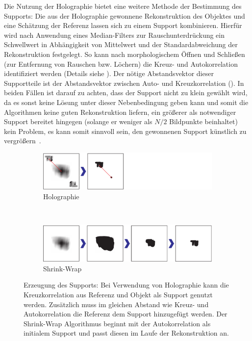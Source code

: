 Die Nutzung der Holographie bietet eine weitere Methode der Bestimmung des Supports: Die aus der Holographie gewonnene Rekonstruktion des Objektes und eine Schätzung der Referenz lassen sich zu einem Support kombinieren. Hierfür wird nach Anwendung eines Median-Filters zur Rauschunterdrückung ein Schwellwert in Abhängigkeit von Mittelwert und der Standardabweichung der Rekonstruktion festgelegt. So kann nach morphologischem Öffnen und Schließen (zur Entfernung von Rauschen bzw. Löchern) die Kreuz- und Autokorrelation identifiziert werden (Details siehe ). Der nötige Abstandsvektor dieser Supportteile ist der Abstandsvektor zwischen Auto- und Kreuzkorrelation ().
In beiden Fällen ist darauf zu achten, dass der Support nicht zu klein gewählt wird, da es sonst keine Lösung unter dieser Nebenbedingung geben kann und somit die Algorithmen keine guten Rekonstruktion liefern, ein größerer als notwendiger Support bereitet hingegen (solange er weniger als $N/2$ Bildpunkte beinhaltet) kein Problem, es kann somit sinnvoll sein, den gewonnenen Support künstlich zu vergrößern~\cite{huang2010}.

\begin{figure}
	\centering
	\begin{subfigure}[b]{0.9\textwidth}
		\includegraphics[width=\textwidth]{images/support_holo.pdf}
		\caption{Holographie}
	\end{subfigure}\\

	\begin{subfigure}[b]{0.9\textwidth}
		\includegraphics[width=\textwidth]{images/support_sw.pdf}
		\caption{Shrink-Wrap}	
	\end{subfigure}
	
	\caption[Supportgenerierung]{Erzeugung des Supports: Bei Verwendung von Holographie kann die Kreuzkorrelation aus Referenz und Objekt als Support genutzt werden. Zusätzlich muss im gleichen Abstand wie Kreuz- und Autokorrelation die Referenz dem Support hinzugefügt werden. Der Shrink-Wrap Algorithmus beginnt mit der Autokorrelation als initialem Support und passt diesen im Laufe der Rekonstruktion an.}
	\label{fig:support}
\end{figure} 

